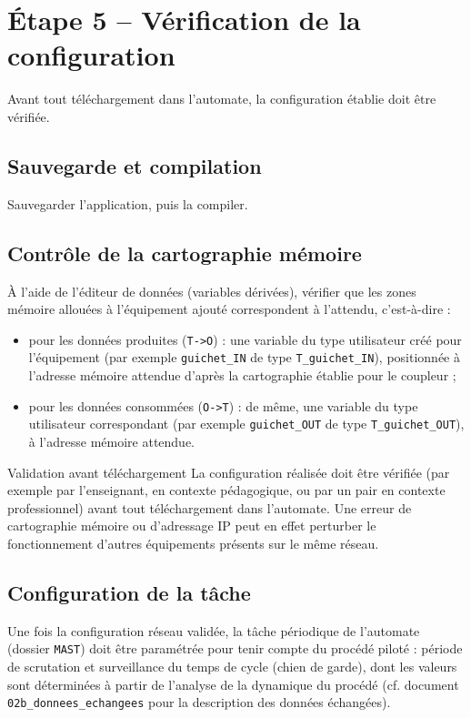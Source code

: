 \section{Étape 5 -- Vérification de la configuration}
\label{secEtapeVerification}

Avant tout téléchargement dans l'automate, la configuration établie doit
être vérifiée.

\subsection{Sauvegarde et compilation}

Sauvegarder l'application, puis la compiler.

\subsection{Contrôle de la cartographie mémoire}

À l'aide de l'éditeur de données (variables dérivées), vérifier que les
zones mémoire allouées à l'équipement ajouté correspondent à l'attendu,
c'est-à-dire :

\begin{itemize}
    \item pour les données produites (\texttt{T->O}) : une variable du type
    utilisateur créé pour l'équipement (par exemple \texttt{guichet\_IN} de
    type \texttt{T\_guichet\_IN}), positionnée à l'adresse mémoire attendue
    d'après la cartographie établie pour le coupleur ;
    \item pour les données consommées (\texttt{O->T}) : de même, une
    variable du type utilisateur correspondant (par exemple
    \texttt{guichet\_OUT} de type \texttt{T\_guichet\_OUT}), à l'adresse
    mémoire attendue.
\end{itemize}

\begin{UPSTIwarning}{Validation avant téléchargement}
La configuration réalisée doit être vérifiée (par exemple par l'enseignant,
en contexte pédagogique, ou par un pair en contexte professionnel) avant
tout téléchargement dans l'automate. Une erreur de cartographie mémoire ou
d'adressage IP peut en effet perturber le fonctionnement d'autres
équipements présents sur le même réseau.
\end{UPSTIwarning}

\subsection{Configuration de la tâche}

Une fois la configuration réseau validée, la tâche périodique de
l'automate (dossier \texttt{MAST}) doit être paramétrée pour tenir compte
du procédé piloté : période de scrutation et surveillance du temps de
cycle (chien de garde), dont les valeurs sont déterminées à partir de
l'analyse de la dynamique du procédé (cf. document
\texttt{02b\_donnees\_echangees} pour la description des données
échangées).
